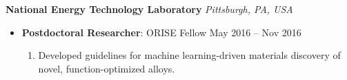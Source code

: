 {\color{black}\textbf{National Energy Technology Laboratory} \hfill \textit{Pittsburgh, PA, USA}}\par
\begin{itemize}
    \item
        \textbf{Postdoctoral Researcher}: ORISE Fellow
        \hfill  {May 2016 -- Nov 2016} \par
        \begin{enumerate}
            \item Developed guidelines for machine learning-driven materials discovery of novel, function-optimized alloys.
        \end{enumerate}
\end{itemize}